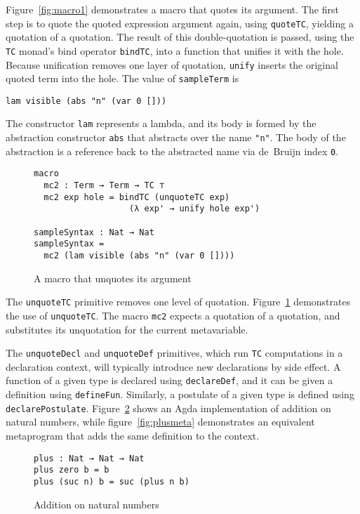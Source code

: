 \documentclass[sigplan,10pt]{acmart}
\begin{document}
Figure~\ref{fig:macro1} demonstrates a macro that quotes its argument.
The first step is to quote the quoted expression argument again, using \texttt{quoteTC}, yielding a quotation of a quotation.
The result of this double-quotation is passed, using the \texttt{TC} monad's bind operator \texttt{bindTC}, into a function that unifies it with the hole.
Because unification removes one layer of quotation, \texttt{unify} inserts the original quoted term into the hole.
The value of {\tt sampleTerm} is
\begin{center}
\begin{BVerbatim}
lam visible (abs "n" (var 0 []))
\end{BVerbatim}
\end{center}
The constructor \texttt{lam} represents a lambda, and its body is formed by the abstraction constructor \texttt{abs} that abstracts over the name \texttt{"n"}.
The body of the abstraction is a reference back to the abstracted name via de~Bruijn index \texttt{0}.

\begin{figure}
  \centering
\begin{Verbatim}
macro
  mc2 : Term → Term → TC ⊤
  mc2 exp hole = bindTC (unquoteTC exp) 
                   (λ exp' → unify hole exp')

sampleSyntax : Nat → Nat
sampleSyntax =
  mc2 (lam visible (abs "n" (var 0 [])))
\end{Verbatim}
  \caption{A macro that unquotes its argument}
  \label{fig:macro2}
\end{figure}

The {\tt unquoteTC} primitive removes one level of quotation.
Figure~\ref{fig:macro2} demonstrates the use of \texttt{unquoteTC}.
The macro {\tt mc2} expects a quotation of a quotation, and substitutes its unquotation for the current metavariable.


The {\tt unquoteDecl} and {\tt unquoteDef} primitives, which run \texttt{TC} computations in a declaration context, will typically introduce new declarations by side effect.
A function of a given type is declared using {\tt declareDef}, and it can be given a definition using {\tt defineFun}.
Similarly, a postulate of a given type is defined using {\tt declarePostulate}.
Figure~\ref{fig:plus} shows an Agda implementation of addition on natural numbers, while figure~\ref{fig:plusmeta} demonstrates an equivalent metaprogram that adds the same definition to the context.


\begin{figure}[h]
\begin{Verbatim}
plus : Nat → Nat → Nat
plus zero b = b
plus (suc n) b = suc (plus n b)
\end{Verbatim}
  \caption{Addition on natural numbers}
  \label{fig:plus}
\end{figure}
\end{document}
